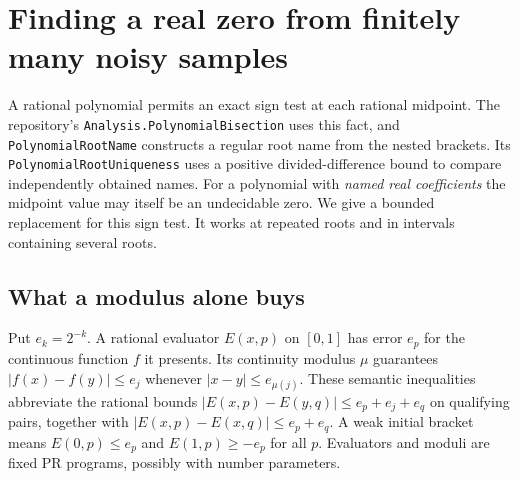 \section{Finding a real zero from finitely many noisy samples}
\label{sec:root-realizer}

A rational polynomial permits an exact sign test at each rational midpoint.
The repository's \texttt{Analysis.PolynomialBisection} uses this fact,
and \texttt{PolynomialRootName} constructs a regular root name from the
nested brackets. Its \texttt{PolynomialRootUniqueness} uses a positive
divided-difference bound to compare independently obtained names.
For a polynomial with \emph{named real coefficients} the midpoint value
may itself be an undecidable zero. We give a bounded replacement for
this sign test. It works at repeated roots and in intervals containing
several roots.

\subsection{What a modulus alone buys}

Put $e_k=2^{-k}$. A rational evaluator $E(x,p)$ on $[0,1]$ has error
$e_p$ for the continuous function $f$ it presents. Its continuity modulus
$\mu$ guarantees $|f(x)-f(y)|\le e_j$ whenever $|x-y|\le e_{\mu(j)}$.
These semantic inequalities abbreviate the rational bounds
$|E(x,p)-E(y,q)|\le e_p+e_j+e_q$ on qualifying pairs, together with
$|E(x,p)-E(x,q)|\le e_p+e_q$. A weak initial bracket means
$E(0,p)\le e_p$ and $E(1,p)\ge-e_p$ for all $p$. Evaluators and moduli
are fixed PR programs, possibly with number parameters.

